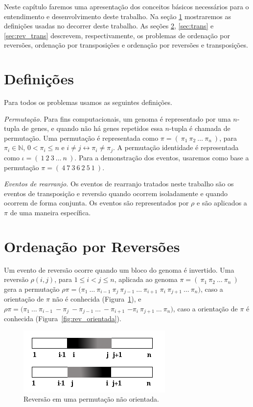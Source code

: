 % 
%
Neste capítulo faremos uma apresentação dos conceitos básicos
necessários para o entendimento e desenvolvimento deste trabalho. Na
seção \ref{sec:defin} mostraremos as definições usadas no decorrer
deste trabalho. As seções \ref{sec:rev}, \ref{sec:trans}
e \ref{sec:rev_trans} descrevem, respectivamente, os problemas de
ordenação por reversões, ordenação por transposições e ordenação por
reversões e transposições.

\section{Definições}
\label{sec:defin}
Para todos os problemas usamos as seguintes definições.

\textit{Permutação.} 
Para fins computacionais, um genoma é representado por uma $n$-tupla
de genes, e quando não há genes repetidos essa $n$-tupla é chamada de
permutação. Uma permutação é representada como $\pi =
(~\pi_{1}~\pi_{2}~\ldots~\pi_{n}~)$, para $\pi_{i} \in \mathbb{N}$, $0
< \pi_{i} \leq n$ e $i \neq j \leftrightarrow \pi_{i} \neq \pi_{j}$. A
permutação identidade é representada como $\iota =
(~1~2~3~\ldots~n~)$. Para a demonstração dos eventos, usaremos como
base a permutação $\pi = (~4~7~3~6~2~5~1~)$.

\textit{Eventos de rearranjo.}
Os eventos de rearranjo tratados neste trabalho são os eventos de
transposição e reversão quando ocorrem isoladamente e quando ocorrem
de forma conjunta. Os eventos são representados por $\rho$ e são
aplicados a $\pi$ de uma maneira específica.

\section{Ordenação por Reversões}
\label{sec:rev}
Um evento de reversão ocorre quando um bloco do genoma é
invertido. Uma reversão $\rho(i, j)$, para $1 \leq i < j \leq n$,
aplicada ao genoma $\pi = (~\pi_{1}~\pi_{2}~\ldots~\pi_{n}~)$ gera a
permutação $\rho\pi =
(\pi_{1}~\ldots~\pi_{i-1}~\pi_{j}~\pi_{j-1}~\ldots~\pi_{i+1}$
$\pi_{i}~ \pi_{j+1}~\ldots~\pi_{n})$, caso a orientação de $\pi$ não é
conhecida (Figura~\ref{fig:rev_nao_orientada}), e $\rho\pi =
(\pi_{1}~\ldots~\pi_{i-1}~-\pi_{j}~-\pi_{j-1}~\ldots~-\pi_{i+1}$
$-\pi_{i}~ \pi_{j+1}~\ldots~\pi_{n})$, caso a orientação de $\pi$ é
conhecida (Figura~\ref{fig:rev_orientada}). 

\begin{figure}
  \centering
  \includegraphics{images/rev_nao_orientada.png} 
  \caption{Reversão em uma permutação não orientada.}
  \label{fig:rev_nao_orientada}
\end{figure}

